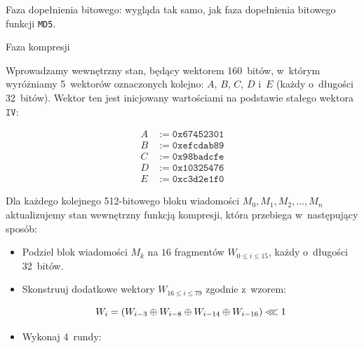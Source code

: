 \documentclass[12pt,a4paper,twoside]{article}
\begin{document}
\begin{myenumerate}

    \item Faza dopełnienia bitowego: wygląda tak samo, jak faza dopełnienia
    bitowego funkcji \texttt{MD5}.

    \item Faza kompresji

    \begin{myenumerate}

        \item Wprowadzamy wewnętrzny stan, będący wektorem 160~bitów, w~którym
        wyróżniamy 5~wektorów oznaczonych kolejno: $A$, $B$, $C$, $D$ i~$E$
        (każdy o~długości 32~bitów). Wektor ten jest inicjowany wartościami na
        podstawie stałego wektora $\mathtt{IV}$:

        \[
            \begin{aligned}
                A &:= \mathtt{0x67452301} \\
                B &:= \mathtt{0xefcdab89} \\
                C &:= \mathtt{0x98badcfe} \\
                D &:= \mathtt{0x10325476} \\
                E &:= \mathtt{0xc3d2e1f0}
            \end{aligned}
        \]

        \item Dla każdego kolejnego 512-bitowego bloku wiadomości \break $M_0,
        M_1, M_2, \ldots, M_n$ aktualizujemy stan wewnętrzny funkcją kompresji,
        która przebiega w~następujący sposób:

        \begin{itemize}

            \item Podziel blok wiadomości $M_k$ na $16$ fragmentów $W_{0 \leq i
            \leq 15}$, każdy o~długości 32~bitów.

            \item Skonstruuj dodatkowe wektory $W_{16 \leq i \leq 79}$ zgodnie
            z~wzorem:

            $$
                W_i = (W_{i-3} \oplus W_{i-8} \oplus W_{i-14} \oplus W_{i-16})
                \llless 1
            $$

            \item Wykonaj 4~rundy:

            \begin{itemize}


\end{itemize}
\end{itemize}
\end{myenumerate}
\end{myenumerate}
\end{document}
